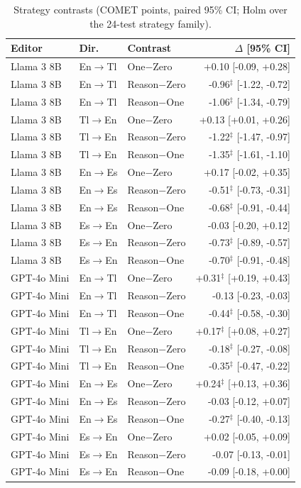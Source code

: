 \begin{table}[t]
\centering\footnotesize
\caption{Strategy contrasts (COMET points, paired 95\% CI; Holm over the 24-test strategy family).}
\label{tab:strategy}
\setlength{\tabcolsep}{2.5pt}
\begin{tabular}{lll r}
\toprule
Editor & Dir. & Contrast & $\Delta$ [95\% CI] \\
\midrule
Llama 3 8B & En$\to$Tl & One$-$Zero & +0.10 [-0.09, +0.28] \\
Llama 3 8B & En$\to$Tl & Reason$-$Zero & -0.96$^\ddagger$ [-1.22, -0.72] \\
Llama 3 8B & En$\to$Tl & Reason$-$One & -1.06$^\ddagger$ [-1.34, -0.79] \\
Llama 3 8B & Tl$\to$En & One$-$Zero & +0.13 [+0.01, +0.26] \\
Llama 3 8B & Tl$\to$En & Reason$-$Zero & -1.22$^\ddagger$ [-1.47, -0.97] \\
Llama 3 8B & Tl$\to$En & Reason$-$One & -1.35$^\ddagger$ [-1.61, -1.10] \\
Llama 3 8B & En$\to$Es & One$-$Zero & +0.17 [-0.02, +0.35] \\
Llama 3 8B & En$\to$Es & Reason$-$Zero & -0.51$^\ddagger$ [-0.73, -0.31] \\
Llama 3 8B & En$\to$Es & Reason$-$One & -0.68$^\ddagger$ [-0.91, -0.44] \\
Llama 3 8B & Es$\to$En & One$-$Zero & -0.03 [-0.20, +0.12] \\
Llama 3 8B & Es$\to$En & Reason$-$Zero & -0.73$^\ddagger$ [-0.89, -0.57] \\
Llama 3 8B & Es$\to$En & Reason$-$One & -0.70$^\ddagger$ [-0.91, -0.48] \\
GPT-4o Mini & En$\to$Tl & One$-$Zero & +0.31$^\ddagger$ [+0.19, +0.43] \\
GPT-4o Mini & En$\to$Tl & Reason$-$Zero & -0.13 [-0.23, -0.03] \\
GPT-4o Mini & En$\to$Tl & Reason$-$One & -0.44$^\ddagger$ [-0.58, -0.30] \\
GPT-4o Mini & Tl$\to$En & One$-$Zero & +0.17$^\ddagger$ [+0.08, +0.27] \\
GPT-4o Mini & Tl$\to$En & Reason$-$Zero & -0.18$^\ddagger$ [-0.27, -0.08] \\
GPT-4o Mini & Tl$\to$En & Reason$-$One & -0.35$^\ddagger$ [-0.47, -0.22] \\
GPT-4o Mini & En$\to$Es & One$-$Zero & +0.24$^\ddagger$ [+0.13, +0.36] \\
GPT-4o Mini & En$\to$Es & Reason$-$Zero & -0.03 [-0.12, +0.07] \\
GPT-4o Mini & En$\to$Es & Reason$-$One & -0.27$^\ddagger$ [-0.40, -0.13] \\
GPT-4o Mini & Es$\to$En & One$-$Zero & +0.02 [-0.05, +0.09] \\
GPT-4o Mini & Es$\to$En & Reason$-$Zero & -0.07 [-0.13, -0.01] \\
GPT-4o Mini & Es$\to$En & Reason$-$One & -0.09 [-0.18, +0.00] \\
\bottomrule
\end{tabular}
\end{table}
